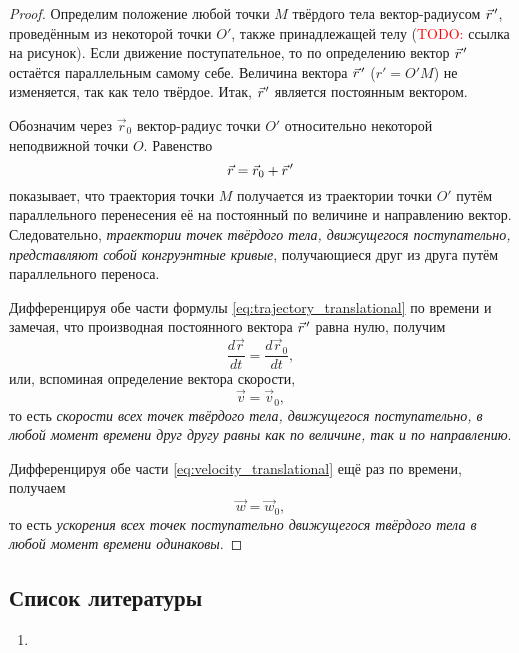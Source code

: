 \documentclass{article}
\theoremstyle{definition}
\theoremstyle{plain}
\theoremstyle{remark}
\numberwithin{equation}{section}
\newcommand{\wvec}[1]{\vec{#1}\mkern2mu\vphantom{#1}}
\newcommand{\pvec}[1]{\wvec{#1}'}
\newcommand{\der}[2][]{\frac{d #1}{d #2}}
\newcommand{\dt}[1][]{\der[#1]{t}}
\begin{document}
\begin{proof}
  Определим положение любой точки $M$ твёрдого тела вектор-радиусом $\pvec{r}$,
  проведённым из некоторой точки $O'$, также принадлежащей телу
  (\textcolor{red}{TODO:} ссылка на рисунок). Если движение поступательное, то
  по определению вектор $\pvec{r}$ остаётся параллельным самому себе. Величина
  вектора $\pvec{r}$ ($r' = O'M$) не изменяется, так как тело твёрдое. Итак,
  $\pvec{r}$ является постоянным вектором.

  Обозначим через $\vec{r}_0$ вектор-радиус точки $O'$ относительно некоторой
  неподвижной точки $O$. Равенство
  \begin{equation}
    \label{eq:trajectory_translational}
    \vec{r} = \vec{r}_0 + \pvec{r}
  \end{equation}
  показывает, что траектория точки $M$ получается из траектории точки $O'$ путём
  параллельного перенесения её на постоянный по величине и направлению вектор.
  Следовательно, \textit{траектории точек твёрдого тела, движущегося
  поступательно, представляют собой конгруэнтные кривые}, получающиеся друг из
  друга путём параллельного переноса.

  Дифференцируя обе части формулы \ref{eq:trajectory_translational} по времени и
  замечая, что производная постоянного вектора $\pvec{r}$ равна нулю, получим
  \begin{equation*}
    \dt[\vec{r}] = \dt[\vec{r}_0],
  \end{equation*}
  или, вспоминая определение вектора скорости,
  \begin{equation}
    \label{eq:velocity_translational}
    \vec{v} = \vec{v}_0,
  \end{equation}
  то есть \textit{скорости всех точек твёрдого тела, движущегося поступательно,
  в любой момент времени друг другу равны как по величине, так и по
  направлению}.

  Дифференцируя обе части \ref{eq:velocity_translational} ещё раз по времени,
  получаем
  \begin{equation}
    \label{eq:acceleration_translational}
    \vec{w} = \vec{w}_0,
  \end{equation}
  то есть \textit{ускорения всех точек поступательно движущегося твёрдого тела в
  любой момент времени одинаковы}.
\end{proof}

\subsection{Список литературы}
\begin{enumerate}
  \item \cite{lourie}
\end{enumerate}
\end{document}
